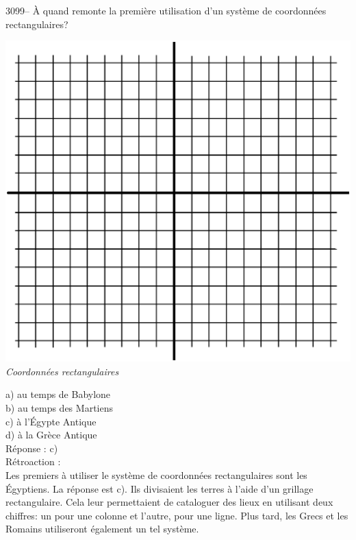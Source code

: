 \documentclass[letterpaper, 12pt]{article}
\begin{document}
3099-- \`A quand remonte la premi\`ere utilisation d'un syst\`eme de coordonn\'ees rectangulaires?
\begin{center}
\includegraphics[scale=0.25]{coordrect.eps}\\
\emph{{\small Coordonn\'ees rectangulaires}}\\
\end{center}

a) au temps de Babylone\\
b) au temps des Martiens\\
c) \`a l'\'Egypte Antique\\
d) \`a la Gr\`ece Antique\\

R\'eponse : c)\\

R\'etroaction :\\
Les premiers \`a utiliser le syst\`eme de coordonn\'ees rectangulaires sont les \'Egyptiens. La r\'eponse est c). Ils divisaient les terres \`a l'aide d'un grillage rectangulaire. Cela leur permettaient de cataloguer des lieux en utilisant deux chiffres: un pour une colonne et l'autre, pour une ligne. Plus tard, les Grecs et les Romains utiliseront \'egalement un tel syst\`eme.\\
\end{document}

